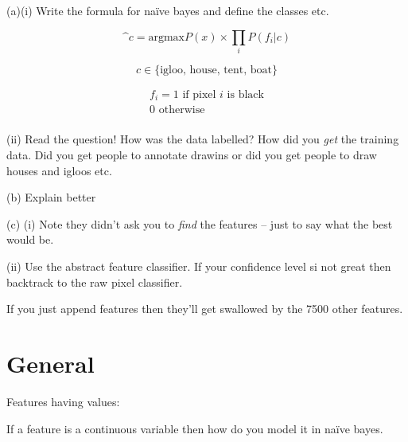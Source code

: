 \documentclass[10pt, a4paper]{article}
\begin{document}
(a)(i) Write the formula for na\"ive bayes and define the classes etc.

\[
\^c = \text{argmax} P(x) \times \prod_i P(f_i|c)
\]

\[
c \in \{\text{igloo, house, tent, boat}\}
\]

\[
\begin{split}
f_i = 1 \text{ if pixel $i$ is black}\\
      0 \text{ otherwise}\\
\end{split}
\]

(ii) Read the question! How was the data labelled? How did you \textit{get} the training data. Did you get people 
to annotate drawins or did you get people to draw houses and igloos etc.

(b) Explain better

(c) (i) Note they didn't ask you to \textit{find} the features -- just to say what the best would be.

(ii) Use the abstract feature classifier. If your confidence level si not great then backtrack to the 
raw pixel classifier.

If you just append features then they'll get swallowed by the 7500 other features.

\section*{General}

Features having values:

If a feature is a continuous variable then how do you model it in na\"ive bayes.
\end{document}
